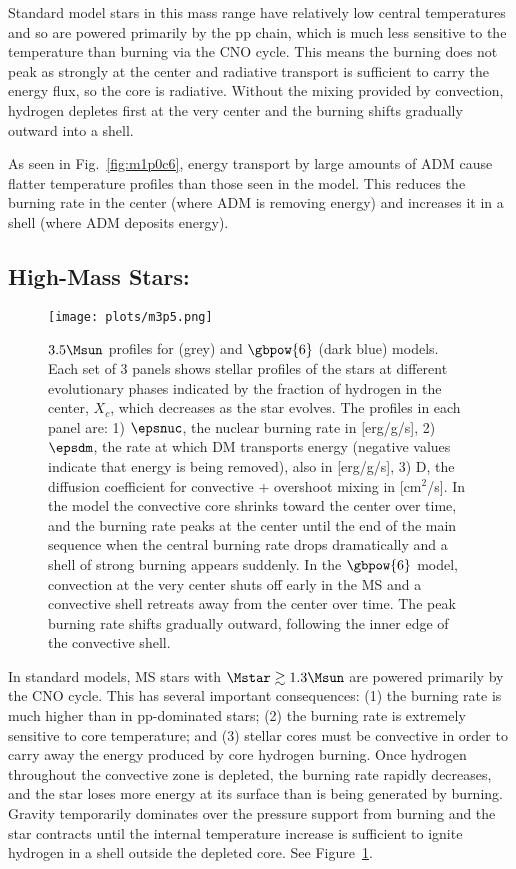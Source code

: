 Standard model stars in this mass range have relatively low central temperatures and so are powered primarily by the pp chain, which is much less sensitive to the temperature than burning via the CNO cycle. This means the burning does not peak as strongly at the center and radiative transport is sufficient to carry the energy flux, so the core is radiative. Without the mixing provided by convection, hydrogen depletes first at the very center and the burning shifts gradually outward into a shell.

As seen in Fig.~\ref{fig:m1p0c6}, energy transport by large amounts of ADM cause flatter temperature profiles than those seen in the \nodm model. This reduces the burning rate in the center (where ADM is removing energy) and increases it in a shell (where ADM deposits energy).



\subsection{High-Mass Stars: \mrangehigh}
\label{sub:highmass}

  \begin{figure}
    \centering
    \texttt{[image: plots/m3p5.png]}
    \caption{$3.5 \Msun$ profiles for \nodm (grey) and $\gbpow{6}$ (dark blue) models. Each set of 3 panels shows stellar profiles of the stars at different evolutionary phases indicated by the fraction of hydrogen in the center, $X_c$, which decreases as the star evolves. The profiles in each panel are: 1) $\epsnuc$, the nuclear burning rate in [erg/g/s], 2) $\epsdm$, the rate at which DM transports energy (negative values indicate that energy is being removed), also in [erg/g/s], 3) D, the diffusion coefficient for convective + overshoot mixing in [cm$^2$/s]. In the \nodm model the convective core shrinks toward the center over time, and the burning rate peaks at the center until the end of the main sequence when the central burning rate drops dramatically and a shell of strong burning appears suddenly. In the $\gbpow{6}$ model, convection at the very center shuts off early in the MS and a convective shell retreats away from the center over time. The peak burning rate shifts gradually outward, following the inner edge of the convective shell.
    }
    \label{fig:m3p5}
  \end{figure}

In standard models, MS stars with $\Mstar \gtrsim 1.3 \Msun$ are powered primarily by the CNO cycle.
This has several important consequences:
(1) the burning rate is much higher than in pp-dominated stars;
(2) the burning rate is extremely sensitive to core temperature;
and (3) stellar cores must be convective in order to carry away the energy produced by core hydrogen burning.
Once hydrogen throughout the convective zone is depleted, the burning rate rapidly decreases, and the star loses more energy at its surface than is being generated by burning. Gravity temporarily dominates over the pressure support from burning and the star contracts until the internal temperature increase is sufficient to ignite hydrogen in a shell outside the depleted core. See Figure~\ref{fig:m3p5}.


